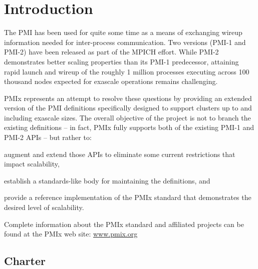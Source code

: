 \chapter{Introduction}
\label{chap:introduction}

The \ac{PMI} has been used for quite some time as a means of exchanging wireup information needed for inter-process communication.
Two versions (PMI-1 and PMI-2) have been released as part of the MPICH effort.
While PMI-2 demonstrates better scaling properties than its PMI-1 predecessor, attaining rapid launch and wireup of the roughly 1 million processes executing across 100 thousand nodes expected for exascale operations remains challenging.

\ac{PMIx} represents an attempt to resolve these questions by providing an extended version of the \ac{PMI} definitions specifically designed to support clusters up to and including exascale sizes.
The overall objective of the project is not to branch the existing definitions -- in fact, PMIx fully supports both of the existing PMI-1 and PMI-2 APIs -- but rather to:

\begin{compactalphaenum}
\item augment and extend those APIs to eliminate some current restrictions that impact scalability,
\item establish a standards-like body for maintaining the definitions, and
\item provide a reference implementation of the PMIx standard that demonstrates the desired level of scalability.
\end{compactalphaenum}

Complete information about the \ac{PMIx} standard and affiliated projects can be found at the \ac{PMIx} web site: \url{www.pmix.org}


\section{Charter}

